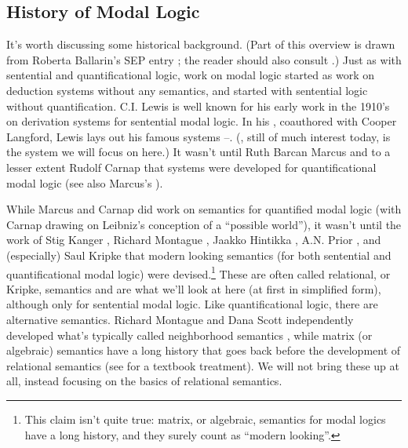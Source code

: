 \subsection{History of Modal Logic}

It's worth discussing some historical background. 
(Part of this overview is drawn from Roberta Ballarin's SEP entry \citeyearpar{Ballarin2010}; the reader should also consult \citealp{Goldblatt2006}.)
Just as with sentential and quantificational logic, work on modal logic started as work on deduction systems without any semantics, and started with sentential logic without quantification.
C.I. Lewis is well known for his early work in the 1910's on derivation systems for sentential modal logic. 
In his \citeyearpar{Lewis1932}, coauthored with Cooper Langford, Lewis lays out his famous systems \SO{}--\SF{}.
(\SF{}, still of much interest today, is the system we will focus on here.)
It wasn't until Ruth Barcan Marcus \citeyearpar{Marcus1946,Marcus1946b,Marcus1947} and to a lesser extent Rudolf Carnap \citeyearpar{Carnap1946,Carnap1947} that systems were developed for quantificational modal logic (see also Marcus's \citeyearpar{Marcus1993}).

While Marcus and Carnap did work on semantics for quantified modal logic (with Carnap drawing on Leibniz's conception of a ``possible world''), it wasn't until the work of Stig Kanger \citeyearpar{Kanger1957}, Richard Montague \citeyearpar{Montague1960}, Jaakko Hintikka \citeyearpar{Hintikka1961}, A.N. Prior \citeyearpar{Prior1957}, and (especially) Saul Kripke \citeyearpar{Kripke1959,Kripke1963,Kripke1963b,Kripke1965} that modern looking semantics (for both sentential and quantificational modal logic) were devised.\footnote{This 
	claim isn't quite true: matrix, or algebraic, semantics for modal logics have a long history, and they surely count as ``modern looking''.} 
These are often called relational, or Kripke, semantics and are what we'll look at here (at first in simplified form), although only for sentential modal logic.
Like quantificational logic, there are alternative semantics. 
Richard Montague \citeyearpar{Montague1970} and Dana Scott \citeyearpar{Scott1970} independently developed what's typically called neighborhood semantics \citep{ArloCosta2006}, while matrix (or algebraic) semantics have a long history that goes back before the development of relational semantics (see \citealp[ch.~3]{Cocchiarella2008modal} for a textbook treatment).
We will not bring these up at all, instead focusing on the basics of relational semantics.

